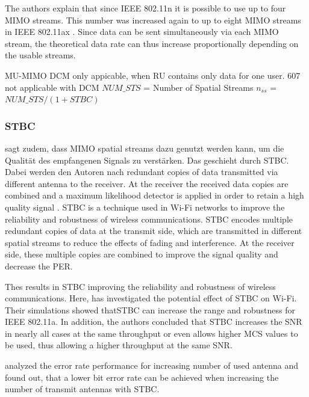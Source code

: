 The authors explain that since IEEE 802.11n it is possible to use up to four MIMO streams. This number was increased again to up to eight MIMO streams in IEEE 802.11ax \cite{noauthor_ieee_2021}. Since data can be sent simultaneously via each MIMO stream, the theoretical data rate can thus increase proportionally depending on the usable streams.

MU-\ac{MIMO} DCM only appicable, when RU contains only data for one user.
\cite{noauthor_ieee_2021} 607 not applicable with DCM
$NUM\_STS$ = Number of Spatial Streams
$n_{ss}$ = $NUM\_STS / (1 + STBC)$
\subsubsection*{\acf{STBC}}
\textcite{abbas_efficient_2016} sagt zudem, dass \ac{MIMO} spatial streams dazu genutzt werden kann, um die Qualität des empfangenen Signals zu verstärken.
Das geschieht durch \ac{STBC}. Dabei werden den Autoren nach redundant copies of data transmitted via different antenna to the receiver. At the receiver the received data copies are combined and a maximum likelihood detector is applied in order to retain a high quality signal \cite{santumon_space-time_2012}.
\ac{STBC} is a technique used in Wi-Fi networks to improve the reliability and robustness of wireless communications.
\ac{STBC} encodes multiple redundant copies of data at the transmit side, which are transmitted in different spatial streams to
reduce the effects of fading and interference. At the receiver side, these multiple copies are combined to improve the
signal quality and decrease the \ac{PER}.

Thes results in \ac{STBC} improving the reliability and robustness of wireless communications.
Here, \textcite{stamoulis_impact_2003} has investigated the potential effect of \ac{STBC} on Wi-Fi. Their simulations showed that\ac{STBC} can increase the range and robustness for IEEE 802.11a.
In addition, the authors concluded that \ac{STBC} increases the \ac{SNR} in nearly all cases at the same throughput or even allows higher \ac{MCS} values to be used,
thus allowing a higher throughput at the same \ac{SNR}.

\textcite{ghosh_error_2014} analyzed the error rate performance for increasing number of used antenna and found out, that a lower bit error rate can be achieved
when increasing the number of transmit antennas with \ac{STBC}.

